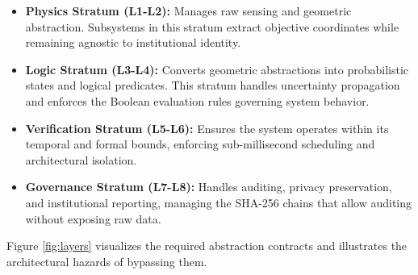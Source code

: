 \documentclass[conference]{IEEEtran}
\begin{document}
\begin{itemize}
    \item \textbf{Physics Stratum (L1-L2):} Manages raw sensing and geometric abstraction. Subsystems in this stratum extract objective coordinates while remaining agnostic to institutional identity.
    \item \textbf{Logic Stratum (L3-L4):} Converts geometric abstractions into probabilistic states and logical predicates. This stratum handles uncertainty propagation and enforces the Boolean evaluation rules governing system behavior.
    \item \textbf{Verification Stratum (L5-L6):} Ensures the system operates within its temporal and formal bounds, enforcing sub-millisecond scheduling and architectural isolation.
    \item \textbf{Governance Stratum (L7-L8):} Handles auditing, privacy preservation, and institutional reporting, managing the SHA-256 chains that allow auditing without exposing raw data.
\end{itemize}

Figure \ref{fig:layers} visualizes the required abstraction contracts and illustrates the architectural hazards of bypassing them. 
\end{document}
